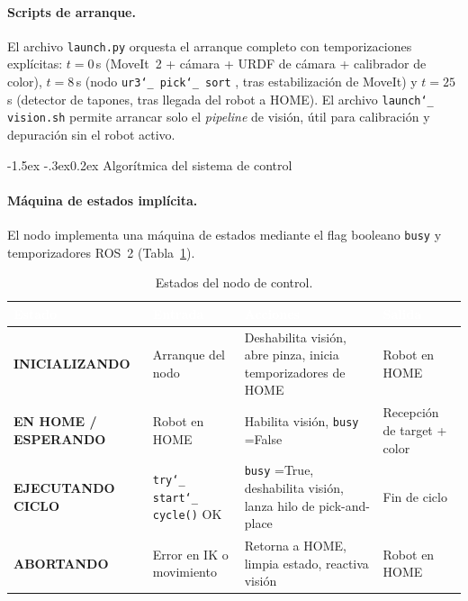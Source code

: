 \documentclass[12pt,a4paper]{article}
\makeatletter
\renewcommand\subsubsection{\@startsection{subsubsection}{3}{\z@}%
  {-1.5ex \@plus -.3ex}{0.2ex}%
  {\normalsize\bfseries\color{MediumBlue}}}
\newcommand{\rowA}{\rowcolor{LightGray}}
\newcommand{\rowB}{\rowcolor{white}}
\newcommand{\code}[1]{%
  \begingroup
  \def\_{\char`_\penalty0 }%
  \def\/{\char`/\penalty0 }%
  \texttt{\small #1}%
  \endgroup}
\makeatother
\begin{document}
\paragraph{Scripts de arranque.}
El archivo \code{launch.py} orquesta el arranque completo con temporizaciones explícitas:
$t=0$\,s (MoveIt~2 + cámara + URDF de cámara + calibrador de color), $t=8$\,s (nodo
\code{ur3\_pick\_sort}, tras estabilización de MoveIt) y $t=25$\,s (detector de tapones, tras llegada del
robot a HOME). El archivo \code{launch\_vision.sh} permite arrancar solo el \textit{pipeline} de visión,
útil para calibración y depuración sin el robot activo.

\subsubsection{Algorítmica del sistema de control}

\paragraph{Máquina de estados implícita.}
El nodo implementa una máquina de estados mediante el flag booleano \code{busy} y temporizadores ROS~2
(Tabla~\ref{tab:ctrl-fsm}).

\begin{table}[H]
\centering
\caption{Estados del nodo de control.}
\label{tab:ctrl-fsm}
\scriptsize
\renewcommand{\arraystretch}{1.25}
\begin{tabularx}{\textwidth}{|>{\bfseries}l|>{\RaggedRight\arraybackslash}X|>{\RaggedRight\arraybackslash}X|>{\RaggedRight\arraybackslash}X|}
  \hline
  \rowcolor{BlueHeader}
  \textcolor{white}{\bfseries Estado} &
  \textcolor{white}{\bfseries Entrada} &
  \textcolor{white}{\bfseries Acciones} &
  \textcolor{white}{\bfseries Salida} \\
  \hline
  \rowA INICIALIZANDO & Arranque del nodo & Deshabilita visión, abre pinza, inicia temporizadores de HOME & Robot en HOME \\
  \rowB EN HOME / ESPERANDO & Robot en HOME & Habilita visión, \code{busy}=False & Recepción de target + color \\
  \rowA EJECUTANDO CICLO & \code{try\_start\_cycle()} OK & \code{busy}=True, deshabilita visión, lanza hilo de pick-and-place & Fin de ciclo \\
  \rowB ABORTANDO & Error en IK o movimiento & Retorna a HOME, limpia estado, reactiva visión & Robot en HOME \\
  \hline
\end{tabularx}
\end{table}
\end{document}
